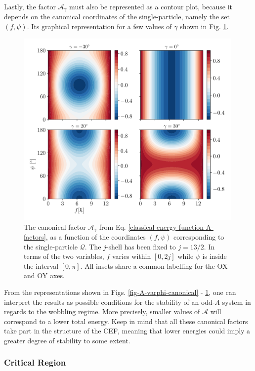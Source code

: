 Lastly, the factor $\mathcal{A}_{\gamma}$ must also be represented as a contour plot, because it depends on the canonical coordinates of the single-particle, namely the set $(f,\psi)$. Its graphical representation for a few values of $\gamma$ shown in Fig. \ref{fig-A-gamma-canonical}.
\begin{figure}
    \centering
    \includegraphics[width=0.99\textwidth]{Chapters/Figures/A_gamma.pdf}
    \caption{The canonical factor $\mathcal{A}_\gamma$ from Eq. \ref{classical-energy-function-A-factors}, as a function of the coordinates $(f,\psi)$ corresponding to the single-particle $\mathcal{Q}$. The $j$-shell has been fixed to $j=13/2$. In terms of the two variables, $f$ varies within $[0,2j]$ while $\psi$ is inside the interval $[0,\pi]$. All insets share a common labelling for the OX and OY axes.}
    \label{fig-A-gamma-canonical}
\end{figure}

From the representations shown in Figs. \ref{fig-A-varphi-canonical} - \ref{fig-A-gamma-canonical}, one can interpret the results as possible conditions for the stability of an odd-$A$ system in regards to the wobbling regime. More precisely, smaller values of $\mathcal{A}$ will correspond to a lower total energy. Keep in mind that all these canonical factors take part in the structure of the CEF, meaning that lower energies could imply a greater degree of stability to some extent.

\subsubsection{Critical Region}

